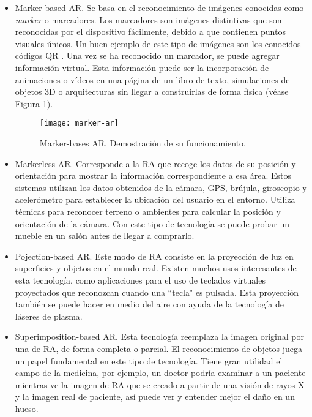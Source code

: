 \begin{itemize}
    \item 
    Marker-based AR. Se basa en el reconocimiento de imágenes conocidas como \textit{marker} o marcadores. Los marcadores son imágenes distintivas que son reconocidas por el dispositivo fácilmente, debido a que contienen puntos visuales únicos. Un buen ejemplo de este tipo de imágenes son los conocidos códigos QR \cite{URL::CodigoQR}. Una vez se ha reconocido un marcador, se puede agregar información virtual. Esta información puede ser la incorporación de animaciones o vídeos en una página de un libro de texto, simulaciones de objetos 3D o arquitecturas sin llegar a construirlas de forma física (véase Figura \ref{fig:markerAR}).
    \begin{figure}[h]
        \centering
        \texttt{[image: marker-ar]}
        \caption{Marker-bases AR. Demostración de su funcionamiento.}
        \label{fig:markerAR}
    \end{figure}

    \bigskip
    \bigskip

    \item Markerless AR. Corresponde a la RA que recoge los datos de su posición y orientación para mostrar la información correspondiente a esa área. Estos sistemas utilizan los datos obtenidos de la cámara, GPS, brújula, giroscopio y acelerómetro para establecer la ubicación del usuario en el entorno. Utiliza técnicas para reconocer terreno o ambientes para calcular la posición y orientación de la cámara. Con este tipo de tecnología se puede probar un mueble en un salón antes de llegar a comprarlo.

 
    \item Pojection-based AR. Este modo de RA consiste en la proyección de luz en superficies y objetos en el mundo real. Existen muchos usos interesantes de esta tecnología, como aplicaciones para el uso de teclados virtuales proyectados que reconozcan cuando una ``tecla" es pulsada. Esta proyección también se puede hacer en medio del aire con ayuda de la tecnología de láseres de plasma.

    \item Superimposition-based AR. Esta tecnología reemplaza la imagen original por una de RA, de forma completa o parcial. El reconocimiento de objetos juega un papel fundamental en este tipo de tecnología. Tiene gran utilidad el campo de la medicina, por ejemplo, un doctor podría examinar a un paciente mientras ve la imagen de RA que se creado a partir de una visión de rayos X y la imagen real de paciente, así puede ver y entender mejor el daño en un hueso.
\end{itemize} 

